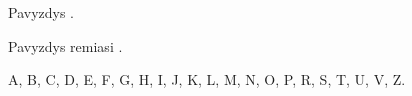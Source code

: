 \documentclass[10pt, a5paper, onecolumn, titlepage, twoside, intlimits, fleqn]{report}
\begin{document}
\myinit


Pavyzdys \citep{kernighan1988c}.

Pavyzdys remiasi \citet*{kernighan1988c}.

\myliterature

\clearpage
\begin{myappendices}

A, B, C, D, E, F, G, H, I, J, K, L, M, N, O, P, R, S, T, U, V, Z.

\end{myappendices}
\end{document}
